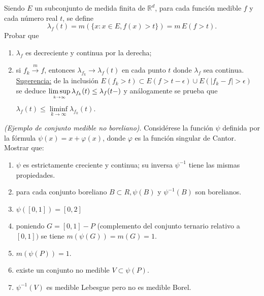 \documentclass{book}
\newcommand{\rr}{\mathbb{R}}
\begin{document}
\begin{ejer}{} 
 Siendo $E$ un subconjunto de medida finita de $\rr^d$,\;  para cada función medible $f$
y cada n\'umero real $t$, se define
$$\lambda_f(t)=m(\{x:x\in E,f(x)>t\})=m\,E(f>t).$$
Probar que 
	\begin{enumerate}
  \item $\lambda_f$ es decreciente y continua por la derecha;
  \item si $f_k \stackrel {m}{\rightarrow}f$, entonces $\lambda_{f_k} \rightarrow \lambda_f(t)$
  en cada punto $t$ donde $\lambda_f$ sea continua.
\\
  \underline{Sugerencia:}
de la inclusión $E(f_k>t)\subset E(f>t-\epsilon)\cup E(|f_k-f|>\epsilon) $
se deduce \;$\limsup\limits_{{k\rightarrow \infty}\atop} \lambda_{f_k}(t)\leq \lambda_{f}(t-)$\; y análogamente se prueba que 
\;$\lambda_f(t)\leq \liminf\limits_{k\rightarrow \infty} \lambda_{f_k}(t).\;$
	\end{enumerate}
\end{ejer}


\begin{ejer}{} \emph{(Ejemplo de conjunto medible no boreliano)}. Considérese la función $\psi$ definida por la fórmula $\psi(x)=x+\varphi(x)$, donde $\varphi$ es la función singular de Cantor.
Mostrar que:

\begin{enumerate}[label=\alph*)]
\item $\psi$ es estrictamente creciente y continua; su inversa $\psi^{-1}$ tiene las mismas propiedades.
\item para cada conjunto boreliano $B \subset R, \psi(B)$ y $\psi^{-1}(B)$ son borelianos.
\item $\psi([0,1])=[0,2]$
\item poniendo $G=[0,1]-P$ (complemento del conjunto ternario relativo a $[0,1])$ se tiene $m(\psi(G))=m(G)=1$.
\item $m(\psi(P))=1$.
\item existe un conjunto no medible $V \subset \psi(P)$.
\item $\psi^{-1}(V)$ es medible Lebesgue pero no es medible Borel.
 \end{enumerate}
\end{ejer}



\end{document}

